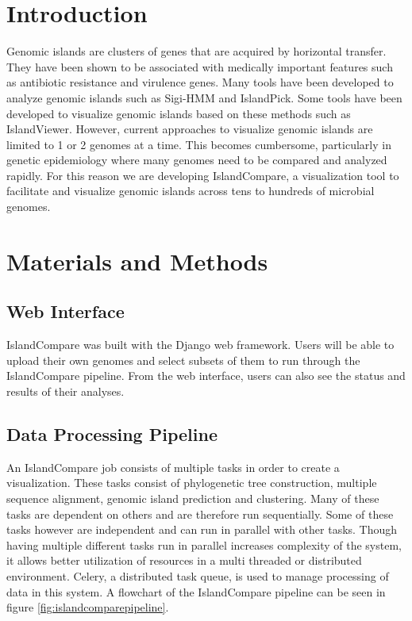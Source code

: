 	\section{Introduction}
		Genomic islands are clusters of genes that are acquired by horizontal transfer.\cite{3_dobrindt_2004} They have been shown to be associated with medically important features such as antibiotic resistance and virulence genes.\cite{3_dobrindt_2004} Many tools have been developed to analyze genomic islands such as Sigi-HMM and IslandPick.\cite{11_sigihmm, 14_islandpick} Some tools have been developed to visualize genomic islands based on these methods such as IslandViewer.\cite{2_islandviewer3} However, current approaches to visualize genomic islands are limited to 1 or 2 genomes at a time. This becomes cumbersome, particularly in genetic epidemiology where many genomes need to be compared and analyzed rapidly. For this reason we are developing IslandCompare, a visualization tool to facilitate and visualize genomic islands across tens to hundreds of microbial genomes.
        
	\section{Materials and Methods}
	
	\subsection{Web Interface}
		IslandCompare was built with the Django web framework.\cite{8_django_2016} Users will be able to upload their own genomes and select subsets of them to run through the IslandCompare pipeline. From the web interface, users can also see the status and results of their analyses.
	
	\subsection{Data Processing Pipeline}
		An IslandCompare job consists of multiple tasks in order to create a visualization. These tasks consist of phylogenetic tree construction, multiple sequence alignment, genomic island prediction and clustering. Many of these tasks are dependent on others and are therefore run sequentially. Some of these tasks however are independent and can run in parallel with other tasks. Though having multiple different tasks run in parallel increases complexity of the system, it allows better utilization of resources in a multi threaded or distributed environment. Celery, a distributed task queue, is used to manage processing of data in this system.\cite{9_celery} A flowchart of the IslandCompare pipeline can be seen in figure \ref{fig:islandcomparepipeline}.
		
